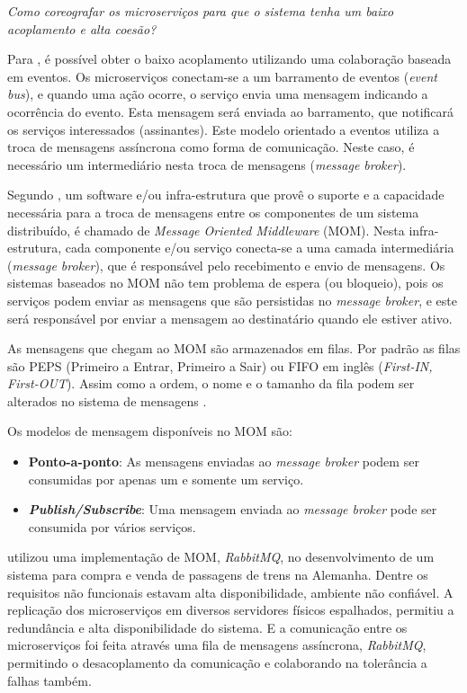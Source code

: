 \documentclass[12pt]{article}
\theoremstyle{plain}
\begin{document}
\emph{Como coreografar os microserviços para que o sistema tenha um baixo acoplamento e alta coesão?}

Para \cite{damore:2018, Newman:15}, é possível obter o baixo acoplamento utilizando uma colaboração baseada em eventos. Os microserviços conectam-se a um barramento de eventos (\textit{event bus}), e quando uma ação ocorre, o serviço envia uma mensagem indicando a ocorrência do evento. Esta mensagem será enviada ao barramento, que notificará os serviços interessados (assinantes). Este modelo orientado a eventos utiliza a troca de mensagens assíncrona como forma de comunicação. Neste caso, é necessário um intermediário nesta troca de mensagens (\textit{message broker}). 

Segundo \cite{Curry2004}, um software e/ou infra-estrutura que provê o suporte e a capacidade necessária para a troca de mensagens entre os componentes de um sistema distribuído, é chamado de \textit{Message Oriented Middleware} (MOM). Nesta infra-estrutura, cada componente e/ou serviço conecta-se a uma camada intermediária (\textit{message broker}), que é responsável pelo recebimento e envio de mensagens. Os sistemas baseados no MOM não tem problema de espera (ou bloqueio), pois os serviços podem enviar as mensagens que são persistidas no \textit{message broker}, e este será responsável por enviar a mensagem ao destinatário quando ele estiver ativo.

As mensagens que chegam ao MOM são armazenados em filas. Por padrão as filas são PEPS (Primeiro a Entrar, Primeiro a Sair) ou FIFO em inglês (\textit{First-IN, First-OUT}). Assim como a ordem, o nome e o tamanho da fila podem ser alterados no sistema de mensagens \cite{Curry2004}.  

Os modelos de mensagem disponíveis no MOM são:
\begin{itemize}
    \item \textbf{Ponto-a-ponto}: As mensagens enviadas ao \textit{message broker} podem ser consumidas por apenas um e somente um serviço.
    \item \textbf{\textit{Publish/Subscribe}}: Uma mensagem enviada ao \textit{message broker} pode ser consumida por vários serviços.
\end{itemize}

\cite{richter:2017} utilizou uma implementação de MOM, \textit{RabbitMQ}, no desenvolvimento de um sistema para compra e venda de passagens de trens na Alemanha. Dentre os requisitos não funcionais estavam alta disponibilidade, ambiente não confiável. A replicação dos microserviços em diversos servidores físicos espalhados, permitiu a redundância e alta disponibilidade do sistema. E a comunicação entre os microserviços foi feita através uma fila de mensagens assíncrona, \textit{RabbitMQ}, permitindo o desacoplamento da comunicação e colaborando na tolerância a falhas também.
\end{document}
